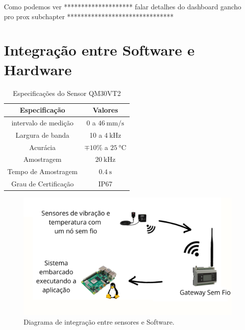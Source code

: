 Como podemos ver ******************** falar detalhes do dashboard
gancho pro prox subchapter *******************************

% 

\section{Integração entre Software e Hardware}


\begin{table}[H]
    \caption{Especificações do Sensor QM30VT2}
    \label{tab:simulador}
    \centering%
    \begin{minipage}{.45\textwidth}
      \begin{tabular*}{\textwidth}{c|c}
        \hline
        Especificação            & Valores                                     \\ \hline
        \hline
        intervalo de medição     &  0 a $\SI{46}{\milli\metre\per\second}$     \\
        Largura de banda         &  10 a $\SI{4}{\kilo\hertz}$                 \\ 
        Acurácia                 &  $\mp 10 \%$ a $\SI{25}{\celsius}$          \\
        Amostragem               &  $\SI{20}{\kilo\hertz}$                     \\
        Tempo de Amostragem      &  $\SI{0.4}{\second}$                        \\
        Grau de Certificação     &  IP67                                       \\
      \end{tabular*}
    \end{minipage}
  \end{table}



\begin{figure}[H]
    \caption{Diagrama de integração entre sensores e Software.}
    \begin{center}
        \includegraphics[scale=0.25, page=1]{metodologia/img/fluxo_layout.pdf}
    \end{center}
    \label{fig:sensor_exaustor}
\end{figure}


